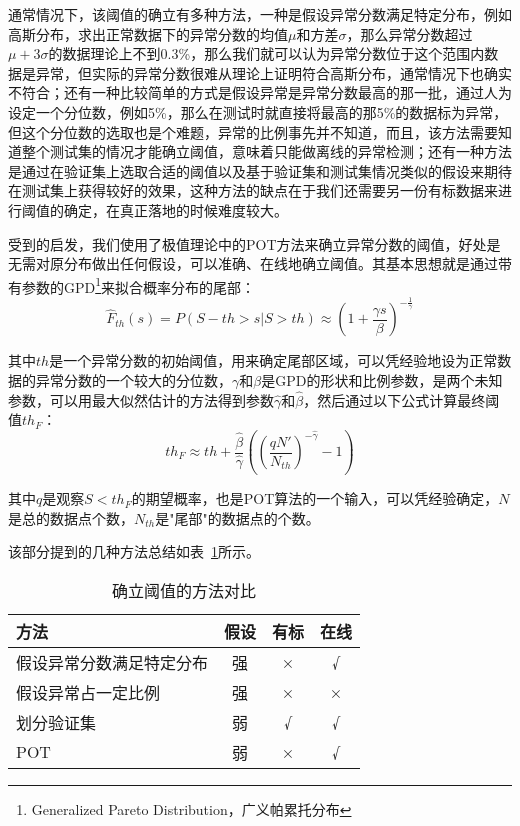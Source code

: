 通常情况下，该阈值的确立有多种方法，一种是假设异常分数满足特定分布，例如高斯分布，求出正常数据下的异常分数的均值$\mu$和方差$\sigma$，那么异常分数超过$\mu + 3\sigma$的数据理论上不到0.3\%，那么我们就可以认为异常分数位于这个范围内数据是异常，但实际的异常分数很难从理论上证明符合高斯分布，通常情况下也确实不符合；还有一种比较简单的方式是假设异常是异常分数最高的那一批，通过人为设定一个分位数，例如5\%，那么在测试时就直接将最高的那5\%的数据标为异常，但这个分位数的选取也是个难题，异常的比例事先并不知道，而且，该方法需要知道整个测试集的情况才能确立阈值，意味着只能做离线的异常检测；还有一种方法是通过在验证集上选取合适的阈值以及基于验证集和测试集情况类似的假设来期待在测试集上获得较好的效果，这种方法的缺点在于我们还需要另一份有标数据来进行阈值的确定，在真正落地的时候难度较大。

受到\cite{siffer2017anomaly}的启发，我们使用了极值理论中的POT方法来确立异常分数的阈值，好处是无需对原分布做出任何假设，可以准确、在线地确立阈值。其基本思想就是通过带有参数的GPD\footnote{Generalized Pareto Distribution，广义帕累托分布}来拟合概率分布的尾部：
\begin{equation*}
  \hat{F}_{th}(s) = P(S - th > s | S > th) \approx (1 + \frac{\gamma s}{\beta})^{-\frac{1}{\gamma}}
\end{equation*}

其中$th$是一个异常分数的初始阈值，用来确定尾部区域，可以凭经验地设为正常数据的异常分数的一个较大的分位数，$\gamma$和$\beta$是GPD的形状和比例参数，是两个未知参数，可以用最大似然估计\cite{white1982maximum}的方法得到参数$\hat{\gamma}$和$\hat{\beta}$，然后通过以下公式计算最终阈值$th_F$：
\begin{equation*}
  th_F \approx th + \frac{\hat{\beta}}{\hat{\gamma}}((\frac{qN'}{N_{th}})^{-\hat{\gamma}}-1)
\end{equation*}

其中$q$是观察$S<th_F$的期望概率，也是POT算法的一个输入，可以凭经验确定，$N$是总的数据点个数，$N_{th}$是"尾部"的数据点的个数。

该部分提到的几种方法总结如表~\ref{tab:threshold}所示。


\begin{table}[htbp]
  \centering
  \begin{tabular}{lccc}
    \toprule
    方法 & 假设 & 有标 & 在线 \\
    \midrule
    假设异常分数满足特定分布 & 强 & × & √ \\
    假设异常占一定比例 & 强 & × & × \\
    划分验证集 & 弱 & √ & √ \\
    POT & 弱 & × & √\\
    \bottomrule
   \end{tabular}
   \caption{确立阈值的方法对比}
   \label{tab:threshold}
\end{table}

